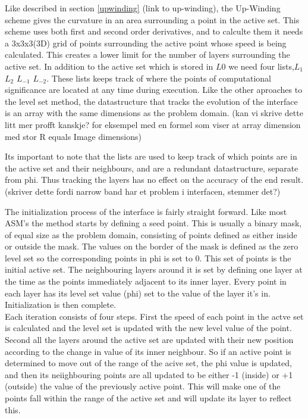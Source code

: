 Like described in section \ref{upwinding} (link to up-winding), the Up-Winding scheme gives the curvature in an area surrounding a point in the active set. This scheme uses both first and second order derivatives, and to calculte them it needs a 3x3x3(3D) grid of points surrounding the active point whose speed is being calculated. This creates a lower limit for the number of layers surrounding the active set. In addition to the active set which is stored in \(L{0}\) we need four lists,\(L_{1}\)  \(L_{2}\) \(L_{-1}\) \(L_{-2}\). These lists keeps track of where the points of computational significance are located at any time during execution. Like the other aproaches to the level set method, the datastructure that tracks the evolution of the interface is an array with the same dimensions as the problem domain. (kan vi skrive dette litt mer profft kanskje? for eksempel med en formel som viser at array dimension med stor R equals Image dimensions)

Its important to note that the lists are used to keep track of which points are in the active set and their neighbours, and are a redundant datastructure, separate from phi. Thus tracking the layers has no effect on the accuracy of the end result.(skriver dette fordi narrow band har et problem i interfacen, stemmer det?)


The initialization process of the interface is fairly straight forward. Like most ASM's the method starts by defining a seed point. This is usually a binary mask, of equal size as the problem domain, consisting of points defined as either inside or outside the mask. The values on the border of the mask is defined as the zero level set so the corresponding points in phi is set to 0. This set of points is the initial active set. The neighbouring layers around it is set by defining one layer at the time as the points immediately adjacent to its inner layer. Every point in each layer has its level set value (phi) set to the value of the layer it's in. Initialization is then complete. \\

Each iteration consists of four steps. First the speed of each point in the actve set is calculated and the level set is updated with the new level value of the point. Second all the layers around the active set are updated with their new position according to the change in value of its inner neighbour.  So if an active point is determined to move out of the range of the acive set, the phi value is updated, and then its neiighbouring points are all updated to be either -1 (inside) or +1 (outside) the value of the previously active point. This will make one of the points fall within the range of the active set and will update its layer to reflect this. 






